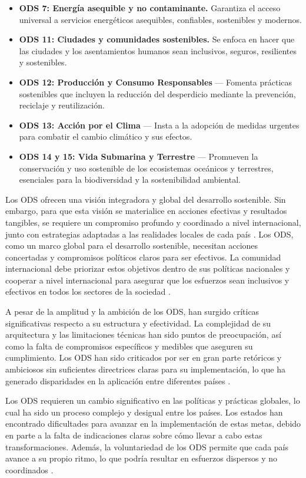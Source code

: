 \documentclass[main.tex]{subfiles}
\begin{document}
\begin{itemize}
		\item \textbf{ODS 7: Energía asequible y no contaminante.} Garantiza el acceso universal a servicios energéticos asequibles, confiables, sostenibles y modernos.
    \item \textbf{ODS 11: Ciudades y comunidades sostenibles.} Se enfoca en hacer que las ciudades y los asentamientos humanos sean inclusivos, seguros, resilientes y sostenibles.
    \item \textbf{ODS 12: Producción y Consumo Responsables} — Fomenta prácticas sostenibles que incluyen la reducción del desperdicio mediante la prevención, reciclaje y reutilización.
    \item \textbf{ODS 13: Acción por el Clima} — Insta a la adopción de medidas urgentes para combatir el cambio climático y sus efectos.
    \item \textbf{ODS 14 y 15: Vida Submarina y Terrestre} — Promueven la conservación y uso sostenible de los ecosistemas oceánicos y terrestres, esenciales para la biodiversidad y la sostenibilidad ambiental.
\end{itemize}

Los ODS ofrecen una visión integradora y global del desarrollo sostenible. Sin embargo, para que esta visión se materialice en acciones efectivas y resultados tangibles, se requiere un compromiso profundo y coordinado a nivel internacional, junto con estrategias adaptadas a las realidades locales de cada país \cite{gil2018objetivos}.
Los ODS, como un marco global para el desarrollo sostenible, necesitan acciones concertadas y compromisos políticos claros para ser efectivos. La comunidad internacional debe priorizar estos objetivos dentro de sus políticas nacionales y cooperar a nivel internacional para asegurar que los esfuerzos sean inclusivos y efectivos en todos los sectores de la sociedad \cite{onu2024ods}.

A pesar de la amplitud y la ambición de los ODS, han surgido críticas significativas respecto a su estructura y efectividad. La complejidad de su arquitectura y las limitaciones técnicas han sido puntos de preocupación, así como la falta de compromisos específicos y medibles que aseguren su cumplimiento. Los ODS han sido criticados por ser en gran parte retóricos y ambiciosos sin suficientes directrices claras para su implementación, lo que ha generado disparidades en la aplicación entre diferentes países \cite{gil2018objetivos}.

Los ODS requieren un cambio significativo en las políticas y prácticas globales, lo cual ha sido un proceso complejo y desigual entre los países. Los estados han encontrado dificultades para avanzar en la implementación de estas metas, debido en parte a la falta de indicaciones claras sobre cómo llevar a cabo estas transformaciones. Además, la voluntariedad de los ODS permite que cada país avance a su propio ritmo, lo que podría resultar en esfuerzos dispersos y no coordinados \cite{gil2018objetivos}.
\end{document}
